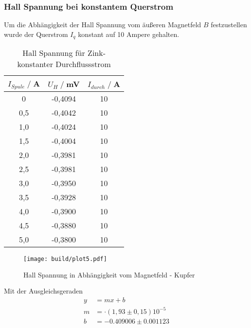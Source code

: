 \subsubsection{Hall Spannung bei konstantem Querstrom}
Um die Abhängigkeit der Hall Spannung vom äußeren Magnetfeld $B$ festzustellen wurde der Querstrom $I_q$ konstant auf 10 Ampere gehalten.
\begin{table}
    \centering
    \begin{tabular}{c c c}
        \toprule
        $I_{Spule} \;/\;$A & $U_H\;/\;$mV & $I_{durch} \;/\;$A\\
        \midrule
            0                   &-0,4094&             10\\
            0,5                 &-0,4042&             10\\
            1,0                 &-0,4024&             10\\
            1,5                 &-0,4004&             10\\
            2,0                 &-0,3981&             10\\
            2,5                 &-0,3981&             10\\
            3,0                 &-0,3950&             10\\
            3,5                 &-0,3928&             10\\
            4,0                 &-0,3900&             10\\
            4,5                 &-0,3880&             10\\
            5,0                 &-0,3800&             10\\
        \bottomrule
    \end{tabular}
    \caption{Hall Spannung für Zink- konstanter Durchflussstrom}
    \label{tab:Zn_I}
\end{table}
\begin{figure}[H]
    \centering
    \texttt{[image: build/plot5.pdf]}
    \caption{Hall Spannung in Abhängigkeit vom Magnetfeld - Kupfer}
    \label{fig:Cu_I}
\end{figure}
Mit der Ausgleichsgeraden
\begin{align*}
    y &= mx + b\\
    m &= \cdot (1,93\pm0,15)10^{-5}\\
    b &=  -0.409006\pm 0.001123\\ %
\end{align*}

